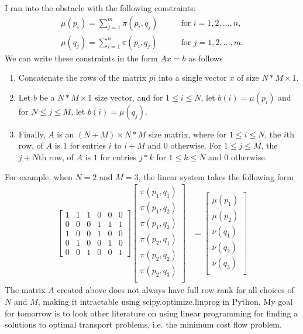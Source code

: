 \documentclass{article}
\numberwithin{equation}{section}
\theoremstyle{definition}
\begin{document}
I ran into the obstacle with the following constraints: 
\begin{align*}
        \mu(p_i)=\sum_{j=1}^m \pi(p_i,q_j) & \qquad \text{for } i=1,2,\ldots,n, \\
        \mu(q_j)=\sum_{i=1}^n \pi(p_i,q_j) & \qquad \text{for } j=1,2,\ldots,m. 
\end{align*}
We can write these constraints in the form $Ax = b$ as follows
\begin{enumerate}
    \item Concatenate the rows of the matrix $pi$ into a single vector $x$ of size $N*M\times 1$.
    \item Let $b$ be a $N*M\times 1$ size vector, and for $1\leq i\leq N$, let $b(i)= \mu(p_i)$ and for $N\leq j\leq M$, let $b(i)= \mu(q_j)$.
    \item Finally, $A$ is an $(N+M)\times N*M$ size matrix, where for $1\leq i \leq N $, the $i$th row, of $A$ is $1$ for entries $i$ to $i+M$ and $0$ otherwise. For $1\leq j \leq M $, the $j+N$th row, of $A$ is $1$ for entries $j*k$ for $1\leq k\leq N$ and $0$ otherwise.
\end{enumerate}
For example, when $N=2$ and $M=3$, the linear system takes the following form
\begin{align*}
    \begin{bmatrix}
    1 & 1 & 1 & 0 & 0 & 0 \\
    0 & 0 & 0 & 1 & 1 & 1\\
    1 & 0 & 0 & 1 & 0 & 0\\
    0 &  1 & 0 & 0 & 1 & 0 \\
    0 & 0 & 1 & 0 & 0 & 1
    \end{bmatrix} 
     \begin{bmatrix}
     \pi(p_1, q_1) \\ 
     \pi(p_1, q_2) \\ 
     \pi(p_1, q_3) \\ 
     \pi(p_2, q_1) \\ 
     \pi(p_2, q_2) \\ 
     \pi(p_2, q_3) \\ 
    \end{bmatrix} 
    & =      \begin{bmatrix}
     \mu(p_1) \\ 
     \mu(p_2)\\ 
     \nu(q_1)\\ 
     \nu(q_2) \\ 
     \nu(q_3) \\ 
    \end{bmatrix} 
\end{align*}
The matrix $A$ created above does not always have full row rank for all choices of $N$ and $M$, making it intractable using scipy.optimize.linprog in Python. My goal for tomorrow is to look other literature on using linear programming for finding a solutions to optimal transport problems, i.e. the minimum cost flow problem.
\end{document}
